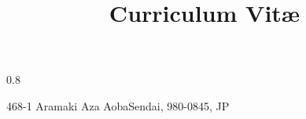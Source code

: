 

\renewcommand{\familydefault}{\sfdefault}         %




\usepackage{breakurl}

\usepackage[utf8]{inputenc}                       %

\usepackage[scale=0.75]{geometry}
\geometry{margin=0.75in}

\usepackage[maxbibnames=99,backend=biber,natbib=true,sorting=ydnt]{biblatex}
\usepackage{import}

\usepackage{etoolbox,changepage}
\patchcmd{\makehead}%
  {0.8\textwidth}%
  {\linewidth}%
  {}{}%
  
\title{Curriculum Vitæ}                               %
\address{Tohoku University}{468-1 Aramaki Aza Aoba}{Sendai, 980-0845, JP}%
